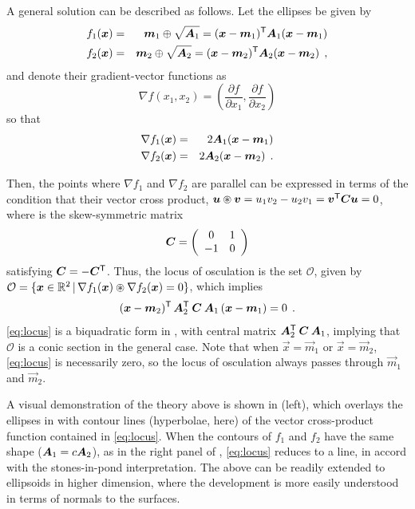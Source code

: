 A general solution can be described as follows.  Let the ellipses be given by
\begin{eqnarray*}
f_1(\bm{x}) & = & \bm{m}_1 \oplus \sqrt{\bm{A}_1} = (\bm{x}-\bm{m}_1)^\mathsf{T} \bm{A}_1 (\bm{x}-\bm{m}_1) \\
f_2(\bm{x}) & = & \bm{m}_2 \oplus \sqrt{\bm{A}_2} = (\bm{x}-\bm{m}_2)^\mathsf{T} \bm{A}_2 (\bm{x}-\bm{m}_2) \:\: , \\
\end{eqnarray*}
and denote their gradient-vector functions as
\begin{equation}
\nabla f(x_1, x_2) = \left(\frac{\partial f}{\partial x_1}, \frac{\partial f}{\partial x_2} \right)
\end{equation}
so that
\begin{eqnarray*}
\nabla f_1(\bm{x}) & = & 2 \bm{A}_1 (\bm{x}-\bm{m}_1) \\
\nabla f_2(\bm{x}) & = & 2 \bm{A}_2 (\bm{x}-\bm{m}_2) \:\: . \\
\end{eqnarray*}

Then, the points where $\nabla f_1$ and $\nabla f_2$ are parallel can be expressed in terms of the
condition that their vector cross product,
$\bm{u} \circledast \bm{v} = u_1 v_2 - u_2 v_1 = \bm{v}^\mathsf{T} \bm{C} \bm{u} = 0$, where  is the skew-symmetric matrix
\begin{equation*}
\bm{C} = \left(
\begin{array}{cc}
 0 & 1 \\ -1 & 0
\end{array}
\right)
\end{equation*}
satisfying $\bm{C} = -\bm{C}^\mathsf{T}$.
Thus, the locus of osculation is the set $\mathcal{O}$, given by $\mathcal{O}  = \{\bm{x} \in \mathbb{R}^{2} \, | \, \nabla f_1(\bm{x}) \circledast \nabla f_2(\bm{x}) = 0 \}$,
which implies
\begin{equation}
(\bm{x}-\bm{m}_2)^\mathsf{T} \, \bm{A}_2 ^\mathsf{T} \: \bm{C} \: \bm{A}_1 \, (\bm{x}-\bm{m}_1) = 0  \:\: .  \label{eq:locus}
\end{equation}
\eqref{eq:locus} is a biquadratic form in , with central matrix $\bm{A}_2 ^\mathsf{T} \: \bm{C} \: \bm{A}_1$,
implying that $\mathcal{O}$ is a conic section in the general case. Note that when $\vec{x}=\vec{m}_1$ or $\vec{x}=\vec{m}_2$,
\eqref{eq:locus} is necessarily zero, so the locus of osculation always passes through  $\vec{m}_1$ and $\vec{m}_2$.

A visual demonstration of the theory above is
shown in  (left), which overlays the ellipses in  with contour lines
(hyperbolae, here)
of
the vector cross-product function contained in \eqref{eq:locus}.
When the contours of $f_1$ and $f_2$ have the same shape ($\bm{A}_1 = c \bm{A}_2 $), as in the right panel of ,
\eqref{eq:locus}
reduces to a line, in accord with the stones-in-pond interpretation.
The above can be readily extended to ellipsoids in higher dimension, where the development is more easily understood
in terms of normals to the surfaces.

